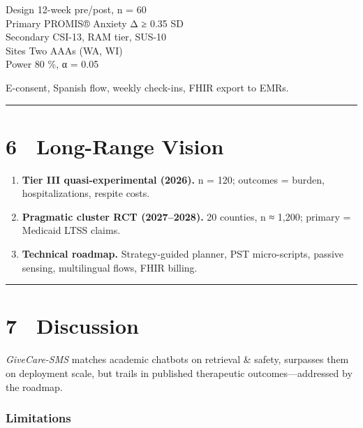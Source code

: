 Design \textbar{} 12-week pre/post, n = 60 \textbar{}\\
Primary \textbar{} PROMIS® Anxiety Δ ≥ 0.35 SD \textbar{}\\
Secondary \textbar{} CSI-13, RAM tier, SUS-10 \textbar{}\\
Sites \textbar{} Two AAAs (WA, WI) \textbar{}\\
Power \textbar{} 80 \%, α = 0.05 \textbar{}

E-consent, Spanish flow, weekly check-ins, FHIR export to EMRs.

\begin{center}\rule{0.5\linewidth}{0.5pt}\end{center}

\section{6 Long-Range Vision}\label{long-range-vision}

\begin{enumerate}
\def\labelenumi{\arabic{enumi}.}
\tightlist
\item
  \textbf{Tier III quasi-experimental (2026).} n = 120; outcomes =
  burden, hospitalizations, respite costs.\\
\item
  \textbf{Pragmatic cluster RCT (2027--2028).} 20 counties, n ≈ 1,200;
  primary = Medicaid LTSS claims.\\
\item
  \textbf{Technical roadmap.} Strategy-guided planner, PST
  micro-scripts, passive sensing, multilingual flows, FHIR billing.
\end{enumerate}

\begin{center}\rule{0.5\linewidth}{0.5pt}\end{center}

\section{7 Discussion}\label{discussion}

\emph{GiveCare-SMS} matches academic chatbots on retrieval \& safety,
surpasses them on deployment scale, but trails in published therapeutic
outcomes---addressed by the roadmap.

\subsubsection{Limitations}\label{limitations}

